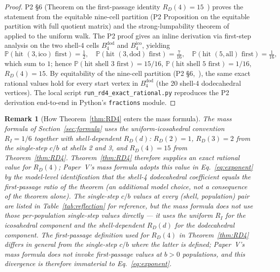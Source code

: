 \documentclass[12pt]{article}
\newtheorem{remark}[theorem]{Remark}
\begin{document}
\begin{proof}
P2 \S 6 (Theorem on the first-passage identity $R_D(4) = 15$~\citep{CascadeAlgSubstrate}) proves the statement from the equitable nine-cell partition (P2 Proposition on the equitable partition with full quotient matrix) and the strong-lumpability theorem of~\citep[Ch.~V]{KemenySnell1976} applied to the uniform walk. The P2 proof gives an inline derivation via first-step analysis on the two shell-4 cells $B_4^{\mathrm{dod}}$ and $B_4^{\mathrm{ico}}$, yielding
\[
  \mathbb{P}(\text{hit }(3,\mathrm{ico})\text{ first}) = \tfrac{1}{2}, \quad
  \mathbb{P}(\text{hit }(3,\mathrm{dod})\text{ first}) = \tfrac{7}{16}, \quad
  \mathbb{P}(\text{hit }(5,\mathrm{all})\text{ first}) = \tfrac{1}{16},
\]
which sum to $1$; hence $\mathbb{P}(\text{hit shell 3 first}) = 15/16$, $\mathbb{P}(\text{hit shell 5 first}) = 1/16$, $R_D(4) = 15$. By equitability of the nine-cell partition (P2 \S 6,~\citep{CascadeAlgSubstrate}), the same exact rational values hold for every start vertex in $B_4^{\mathrm{dod}}$ (the 20 shell-4 dodecahedral vertices). The local script \texttt{run\_rd4\_exact\_rational.py} reproduces the P2 derivation end-to-end in Python's \texttt{fractions} module.
\end{proof}

\begin{remark}[How Theorem~\ref{thm:RD4} enters the mass formula]
The mass formula of Section~\ref{sec:formula} uses the uniform-icosahedral convention $R_I = 1/6$ together with shell-dependent $R_D(d)$: $R_D(2) = 1$, $R_D(3) = 2$ from the single-step $c/b$ at shells 2 and 3, and $R_D(4) = 15$ from Theorem~\ref{thm:RD4}. Theorem~\ref{thm:RD4} therefore supplies an exact rational value for $R_D(4)$; Paper~V's mass formula adopts this value in Eq.~\eqref{eq:exponent} by the model-level identification that the shell-4 dodecahedral coefficient equals the first-passage ratio of the theorem (an additional model choice, not a consequence of the theorem alone). The single-step $c/b$ values at every (shell, population) pair are listed in Table~\ref{tab:reflection} for reference, but the mass formula does not use those per-population single-step values directly --- it uses the uniform $R_I$ for the icosahedral component and the shell-dependent $R_D(d)$ for the dodecahedral component. The first-passage definition used for $R_D(4)$ in Theorem~\ref{thm:RD4} differs in general from the single-step $c/b$ where the latter is defined; Paper~V's mass formula does not invoke first-passage values at $b > 0$ populations, and this divergence is therefore immaterial to Eq.~\eqref{eq:exponent}.
\end{remark}
\end{document}
